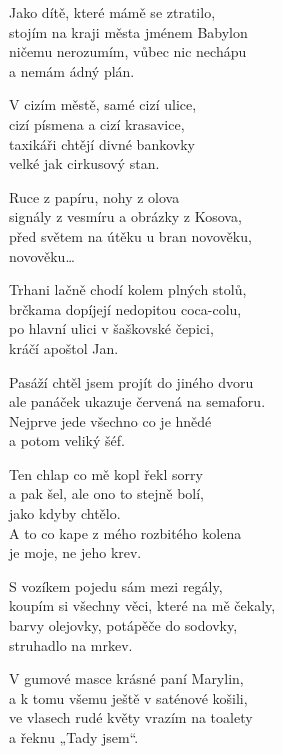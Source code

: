 
\ve{}
Jako dítě, které mámě se ztratilo,\\
stojím na kraji města jménem Babylon \\
ničemu nerozumím, vůbec nic nechápu\\
a nemám ádný plán.
 
\ve{}
V cizím městě, samé cizí ulice, \\
cizí písmena a cizí krasavice, \\
taxikáři chtějí divné bankovky \\
velké jak cirkusový stan.

\cho{}
Ruce z papíru, nohy z olova\\
signály z vesmíru a obrázky z Kosova, \\
před světem na útěku u bran novověku,\\
novověku…
 
\ve{}
Trhani lačně chodí kolem plných stolů, \\
brčkama dopíjejí nedopitou coca-colu, \\
po hlavní ulici v šaškovské čepici,\\
kráčí apoštol Jan.
  
\ve{}
Pasáží chtěl jsem projít do jiného dvoru \\
ale panáček ukazuje červená na semaforu.\\
Nejprve jede všechno co je hnědé\\
a potom veliký šéf.

\ve{}
Ten chlap co mě kopl řekl sorry\\
a pak šel, ale ono to stejně bolí,\\
jako kdyby chtělo.\\
A to co kape z mého rozbitého kolena\\
je moje, ne jeho krev.
 
\cho{}

\ve{}
S vozíkem pojedu sám mezi regály,\\
koupím si všechny věci, které na mě čekaly,\\
barvy olejovky, potápěče do sodovky,\\
struhadlo na mrkev.
 
\ve{}
V gumové masce krásné paní Marylin,\\
a k tomu všemu ještě v saténové košili,\\
ve vlasech rudé květy vrazím na toalety\\
a řeknu „Tady jsem“.
  

